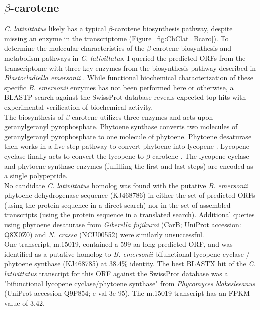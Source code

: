 \subsection*{$\beta$-carotene}
\textit{C. lativittatus} likely has a typical $\beta$-carotene biosynthesis pathway, despite missing an enzyme in the transcriptome (Figure~\ref{fig:ChClat_Bcaro}). To determine the molecular characteristics of the $\beta$-carotene biosynthesis and metabolism pathways in \textit{C. lativittatus}, I queried the predicted ORFs from the transcriptome with three key enzymes from the biosynthesis pathway described in \textit{Blastocladiella emersonii} \cite{Avelar2014}. While functional biochemical characterization of these specific \textit{B. emersonii} enzymes has not been performed here or otherwise, a BLASTP search against the SwissProt database reveals expected top hits with experimental verification of biochemical activity. \\
\indent The biosynthesis of $\beta$-carotene utilizes three enzymes and acts upon geranylgeranyl pyrophosphate. Phytoene synthase converts two molecules of geranylgeranyl pyrophosphate to one molecule of phytoene. Phytoene desaturase then works in a five-step pathway to convert phytoene into lycopene \cite{Hausmann2000}. Lycopene cyclase finally acts to convert the lycopene to $\beta$-carotene \cite{Cunningham1994}. The lycopene cyclase and phytoene synthase enzymes (fulfilling the first and last steps) are encoded as a single polypeptide.\\
\indent No candidate \textit{C. lativittatus} homolog was found with the putative \textit{B. emersonii} phytoene dehydrogenase sequence (KJ468786) in either the set of predicted ORFs (using the protein sequence in a direct search) nor in the set of assembled transcripts (using the protein sequence in a translated search). Additional queries using phytoene desaturase from \textit{Giberella fujikuroi} (CarB; UniProt accession: Q8X0Z0) and \textit{N. crassa} (NCU00552) were similarly unsuccessful. \\
\indent One transcript, m.15019, contained a 599-aa long predicted ORF, and was identified as a putative homolog to \textit{B. emersonii} bifunctional lycopene cyclase / phytoene synthase (KJ468785) at 38.4\% identity. The best BLASTX hit of the \textit{C. lativittatus} transcript for this ORF against the SwissProt database was a "bifunctional lycopene cyclase/phytoene synthase" from\textit{ Phycomyces blakesleeanus} (UniProt accession Q9P854; e-val 3e-95). The m.15019 transcript has an FPKM value of 3.42. \\
